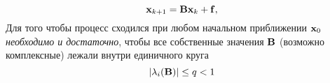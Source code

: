 \documentclass[professionalfonts,compress,unicode]{beamer}
\begin{document}
{
	$$
	{\bf x}_{k+1} = {\bf B} {\bf x}_k + {\bf f},
	$$
	Для того чтобы процесс сходился при любом начальном приближении ${\bf x}_0$ 
	\emph{необходимо и достаточно},
	чтобы все собственные значения ${\bf B}$ (возможно комплексные) лежали внутри единичного круга
	$$
	|\lambda_i({\bf B})| \leq q < 1
	$$
}

%	
%	
%	
%	
\end{document}
